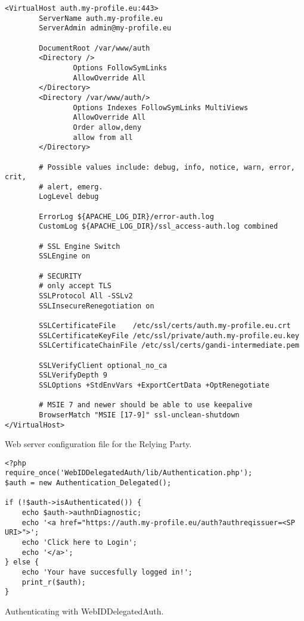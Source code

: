 \newpage
\begin{example}[h]
\begin{verbatim}
<VirtualHost auth.my-profile.eu:443>
        ServerName auth.my-profile.eu
        ServerAdmin admin@my-profile.eu

        DocumentRoot /var/www/auth
        <Directory />
                Options FollowSymLinks
                AllowOverride All
        </Directory>
        <Directory /var/www/auth/>
                Options Indexes FollowSymLinks MultiViews
                AllowOverride All
                Order allow,deny
                allow from all
        </Directory>

        # Possible values include: debug, info, notice, warn, error, crit,
        # alert, emerg.
        LogLevel debug 
        
        ErrorLog ${APACHE_LOG_DIR}/error-auth.log
        CustomLog ${APACHE_LOG_DIR}/ssl_access-auth.log combined

        # SSL Engine Switch
        SSLEngine on

        # SECURITY
        # only accept TLS
        SSLProtocol All -SSLv2
        SSLInsecureRenegotiation on

        SSLCertificateFile    /etc/ssl/certs/auth.my-profile.eu.crt
        SSLCertificateKeyFile /etc/ssl/private/auth.my-profile.eu.key
        SSLCertificateChainFile /etc/ssl/certs/gandi-intermediate.pem

        SSLVerifyClient optional_no_ca
        SSLVerifyDepth 9
        SSLOptions +StdEnvVars +ExportCertData +OptRenegotiate

        # MSIE 7 and newer should be able to use keepalive
        BrowserMatch "MSIE [17-9]" ssl-unclean-shutdown
</VirtualHost>
\end{verbatim}
\caption{Web server configuration file for the Relying Party.}
\label{app:auth_conf}
\end{example}

\newpage
\begin{example}[h]
\begin{verbatim}
<?php
require_once('WebIDDelegatedAuth/lib/Authentication.php');
$auth = new Authentication_Delegated();

if (!$auth->isAuthenticated()) { 
    echo $auth->authnDiagnostic;
    echo '<a href="https://auth.my-profile.eu/auth?authreqissuer=<SP URI>">';
    echo 'Click here to Login';
    echo '</a>';
} else { 
    echo 'Your have succesfully logged in!';
    print_r($auth);
}
\end{verbatim}
\caption{Authenticating with WebIDDelegatedAuth.}
\label{app:webiddelegatedauth}
\end{example}
